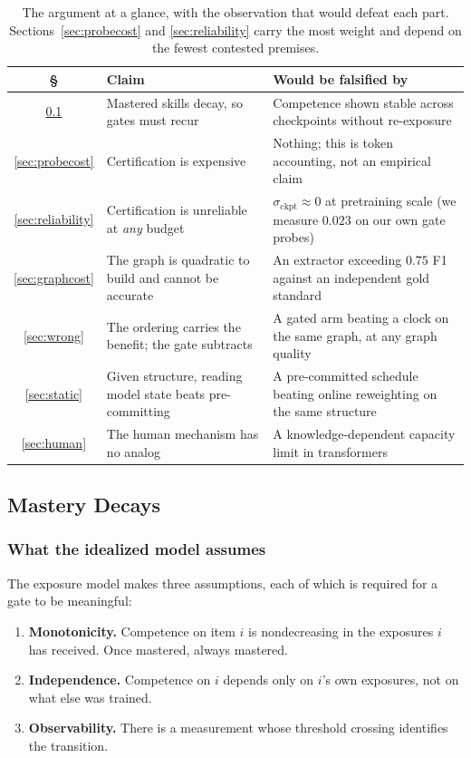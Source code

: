 \documentclass[11pt]{article}
\theoremstyle{plain}
\theoremstyle{definition}
\theoremstyle{remark}
\begin{document}
\begin{table}[ht]
\centering
\small
\begin{tabularx}{\textwidth}{@{}c L L@{}}
\toprule
\S & Claim & Would be falsified by \\
\midrule
\ref{sec:decay} & Mastered skills decay, so gates must recur &
  Competence shown stable across checkpoints without re-exposure \\
\ref{sec:probecost} & Certification is expensive &
  Nothing; this is token accounting, not an empirical claim \\
\ref{sec:reliability} & Certification is unreliable at \emph{any} budget &
  $\sigma_{\text{ckpt}} \approx 0$ at pretraining scale (we measure $0.023$ on
  our own gate probes) \\
\ref{sec:graphcost} & The graph is quadratic to build and cannot be accurate &
  An extractor exceeding $0.75$ F1 against an independent gold standard \\
\ref{sec:wrong} & The ordering carries the benefit; the gate subtracts &
  A gated arm beating a clock on the same graph, at any graph quality \\
\ref{sec:static} & Given structure, reading model state beats pre-committing &
  A pre-committed schedule beating online reweighting on the same structure \\
\ref{sec:human} & The human mechanism has no analog &
  A knowledge-dependent capacity limit in transformers \\
\bottomrule
\end{tabularx}
\caption{The argument at a glance, with the observation that would defeat each
part. Sections~\ref{sec:probecost} and \ref{sec:reliability} carry the most
weight and depend on the fewest contested premises.}
\label{tab:roadmap}
\end{table}

\subsection{Mastery Decays}
\label{sec:decay}

\subsubsection{What the idealized model assumes}

The exposure model makes three assumptions, each of which is required for a gate
to be meaningful:

\begin{enumerate}[leftmargin=1.6em,itemsep=1pt]
  \item \textbf{Monotonicity.} Competence on item $i$ is nondecreasing in the
        exposures $i$ has received. Once mastered, always mastered.
  \item \textbf{Independence.} Competence on $i$ depends only on $i$'s own
        exposures, not on what else was trained.
  \item \textbf{Observability.} There is a measurement whose threshold crossing
        identifies the transition.
\end{enumerate}
\end{document}
